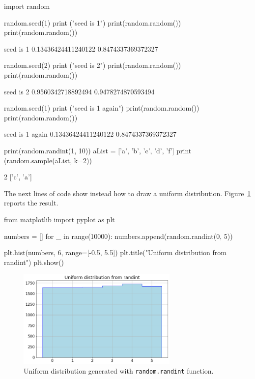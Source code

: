 \begin{ipython}
import random

random.seed(1)
print ("seed is 1")
print(random.random())
print(random.random())
\end{ipython}
\begin{ioutput}
seed is 1
0.13436424411240122
0.8474337369372327
\end{ioutput}
\begin{ipython}
random.seed(2)
print ("seed is 2")
print(random.random())
print(random.random())
\end{ipython}
\begin{ioutput}
seed is 2
0.9560342718892494
0.9478274870593494
\end{ioutput}
\begin{ipython}
random.seed(1)
print ("seed is 1 again")
print(random.random())
print(random.random())
\end{ipython}
\begin{ioutput}
seed is 1 again
0.13436424411240122
0.8474337369372327
\end{ioutput}
\begin{ipython}
print(random.randint(1, 10))
aList = ['a', 'b', 'c', 'd', 'f']
print (random.sample(aList, k=2))
\end{ipython}
\begin{ioutput}
2
['c', 'a']
\end{ioutput}

The next lines of code show instead how to draw a uniform distribution. Figure~\ref{fig:uniform_dist} reports the result.

\begin{ipython}
from matplotlib import pyplot as plt

numbers = []
for _ in range(10000):
    numbers.append(random.randint(0, 5))

plt.hist(numbers, 6, range=[-0.5, 5.5])
plt.title("Uniform distribution from randint")
plt.show()
\end{ipython}

\begin{figure}[h]
\centering
\includegraphics[width=0.7\textwidth]{figures/uniform}
\caption{Uniform distribution generated with \texttt{random.randint} function.}
\label{fig:uniform_dist}
\end{figure}
    
